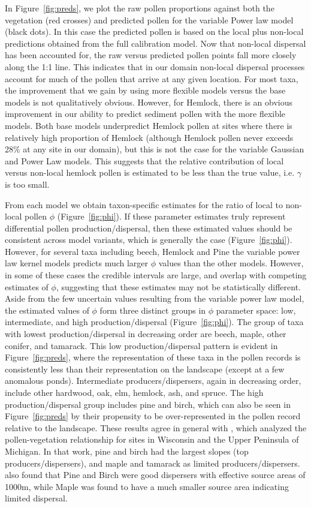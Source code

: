 \documentclass[12pt]{article}
\begin{document}
In Figure~\ref{fig:preds}, we plot the raw pollen proportions against
both the vegetation (red crosses) and predicted pollen for the
variable Power law model (black dots). In this case the predicted
pollen is based on the local plus non-local predictions obtained from
the full calibration model. Now that non-local dispersal has been
accounted for, the raw versus predicted pollen points fall more
closely along the 1:1 line. This indicates that in our domain
non-local dispersal processes account for much of the pollen that
arrive at any given location. For most taxa, the improvement that we
gain by using more flexible models versus the base models is not
qualitatively obvious. However, for Hemlock, there is an obvious
improvement in our ability to predict sediment pollen with the more
flexible models. Both base models underpredict Hemlock pollen at sites
where there is relatively high proportion of Hemlock (although Hemlock
pollen never exceeds 28\% at any site in our domain), but this is not
the case for the variable Gaussian and Power Law models. This suggests
that the relative contribution of local versus non-local hemlock
pollen is estimated to be less than the true value, i.e. $\gamma$ is
too small.

From each model we obtain taxon-specific estimates for the ratio of
local to non-local pollen $\phi$ (Figure~\ref{fig:phi}). If these
parameter estimates truly represent differential pollen
production/dispersal, then these estimated values should be consistent
across model variants, which is generally the case
(Figure~\ref{fig:phi}). However, for several taxa including beech,
Hemlock and Pine the variable power law kernel models predicts much
larger $\phi$ values than the other models. However, in some of these
cases the credible intervals are large, and overlap with competing
estimates of $\phi$, suggesting that these estimates may not be
statistically different. Aside from the few uncertain values resulting
from the variable power law model, the estimated values of $\phi$ form
three distinct groups in $\phi$ parameter space: low, intermediate,
and high production/dispersal (Figure~\ref{fig:phi}). The group of
taxa with lowest production/dispersal in decreasing order are beech,
maple, other conifer, and tamarack. This low production/dispersal
pattern is evident in Figure~\ref{fig:preds}, where the representation
of these taxa in the pollen records is consistently less than their
representation on the landscape (except at a few anomalous
ponds). Intermediate producers/dispersers, again in decreasing order,
include other hardwood, oak, elm, hemlock, ash, and spruce. The high
production/dispersal group includes pine and birch, which can also be
seen in Figure~\ref{fig:preds} by their propensity to be
over-represented in the pollen record relative to the landscape. These
results agree in general with \citep{prentice1986}, which analyzed the
pollen-vegetation relationship for sites in Wisconsin and the Upper
Peninsula of Michigan. In that work, pine and birch had the largest
slopes (top producers/dispersers), and maple and tamarack as limited
producers/dispersers. \citep{jackson1990} also found that Pine and
Birch were good dispersers with effective source areas of 1000m, while
Maple was found to have a much smaller source area indicating limited
dispersal.
\end{document}
